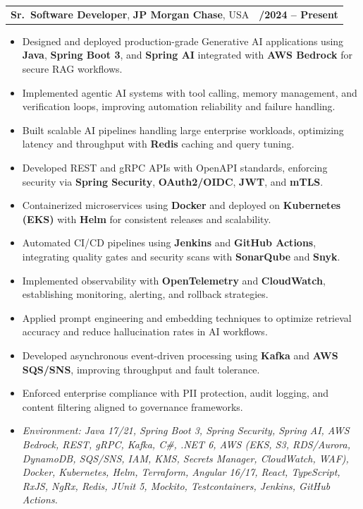 \documentclass[letterpaper,11pt]{article}
\makeatletter
\newcommand{\resumeItem}[1]{
  \item\footnotesize{
    {#1 \vspace{-2pt}}
  }
}
\newcommand{\resumeSubheading}[4]{
  \vspace{-2pt}\item
    \begin{tabular*}{1.0\textwidth}[t]{l@{\extracolsep{\fill}}r}
      \textbf{\fontsize{10pt}{14pt}\selectfont #3}, \textbf{\fontsize{10pt}{14pt}\selectfont #1}, \fontsize{10pt}{14pt}\selectfont #4 & \textbf{\fontsize{10pt}{14pt}\selectfont #2} \\
    \end{tabular*}\vspace{-7pt}
}
\newcommand{\resumeItemListStart}{\begin{itemize}[leftmargin=*]}
\newcommand{\resumeItemListEnd}{\end{itemize}\vspace{-5pt}}
\makeatother
\begin{document}
\resumeSubheading
{JP Morgan Chase}{09/2024 -- Present}
{Sr.\ Software Developer}{USA}
\resumeItemListStart
  \resumeItem{Designed and deployed production-grade Generative AI applications using \textbf{Java}, \textbf{Spring Boot 3}, and \textbf{Spring AI} integrated with \textbf{AWS Bedrock} for secure RAG workflows.}
  \resumeItem{Implemented agentic AI systems with tool calling, memory management, and verification loops, improving automation reliability and failure handling.}
  \resumeItem{Built scalable AI pipelines handling large enterprise workloads, optimizing latency and throughput with \textbf{Redis} caching and query tuning.}
  \resumeItem{Developed REST and gRPC APIs with OpenAPI standards, enforcing security via \textbf{Spring Security}, \textbf{OAuth2/OIDC}, \textbf{JWT}, and \textbf{mTLS}.}
  \resumeItem{Containerized microservices using \textbf{Docker} and deployed on \textbf{Kubernetes (EKS)} with \textbf{Helm} for consistent releases and scalability.}
  \resumeItem{Automated CI/CD pipelines using \textbf{Jenkins} and \textbf{GitHub Actions}, integrating quality gates and security scans with \textbf{SonarQube} and \textbf{Snyk}.}
  \resumeItem{Implemented observability with \textbf{OpenTelemetry} and \textbf{CloudWatch}, establishing monitoring, alerting, and rollback strategies.}
  \resumeItem{Applied prompt engineering and embedding techniques to optimize retrieval accuracy and reduce hallucination rates in AI workflows.}
  \resumeItem{Developed asynchronous event-driven processing using \textbf{Kafka} and \textbf{AWS SQS/SNS}, improving throughput and fault tolerance.}
  \resumeItem{Enforced enterprise compliance with PII protection, audit logging, and content filtering aligned to governance frameworks.}
  \resumeItem{\textit{Environment: Java 17/21, Spring Boot 3, Spring Security, Spring AI, AWS Bedrock, REST, gRPC, Kafka, C\#, .NET 6, AWS (EKS, S3, RDS/Aurora, DynamoDB, SQS/SNS, IAM, KMS, Secrets Manager, CloudWatch, WAF), Docker, Kubernetes, Helm, Terraform, Angular 16/17, React, TypeScript, RxJS, NgRx, Redis, JUnit 5, Mockito, Testcontainers, Jenkins, GitHub Actions.}}
\resumeItemListEnd
\end{document}
